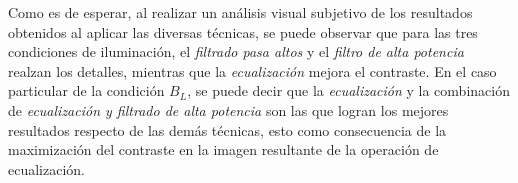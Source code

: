 
Como es de esperar, al realizar un análisis visual subjetivo de los resultados obtenidos al aplicar las diversas técnicas, se puede observar que para las tres condiciones de iluminación, el \textit{filtrado pasa altos} y el \textit{filtro de alta potencia} realzan los detalles, mientras que la \textit{ecualización} mejora el contraste. En el caso particular de la condición $B_{L}$, se puede decir que la \textit{ecualización} y la combinación de \textit{ecualización y filtrado de alta potencia} son las que logran los mejores resultados respecto de las demás técnicas, esto como consecuencia de la maximización del contraste en la imagen resultante de la operación de ecualización.

